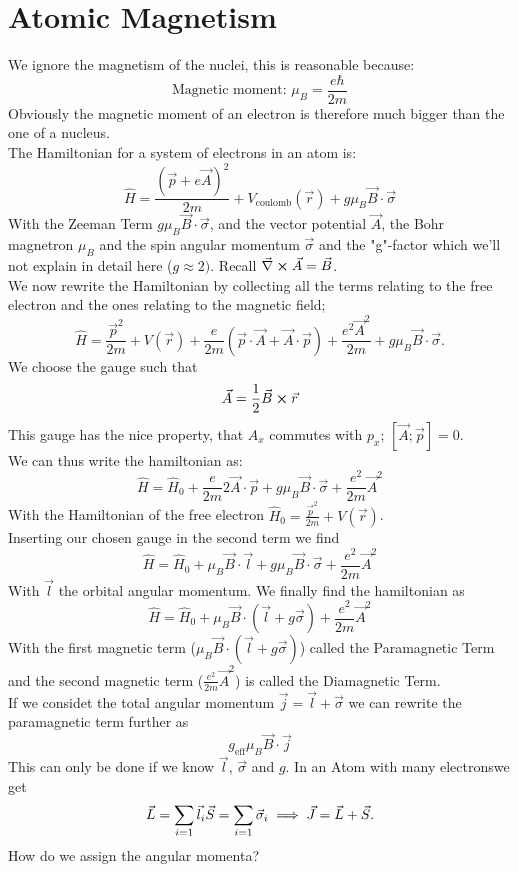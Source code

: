 \documentclass{report}
\begin{document}
\section{Atomic Magnetism}
We ignore the magnetism of the nuclei, this is reasonable because: \[
\text{Magnetic moment: } \mu_B = \frac{e\hbar }{2m}
\] Obviously the magnetic moment of an electron is therefore much bigger than the one of a nucleus.\\
The Hamiltonian for a system of electrons in an atom is: \[
	\hat{H} = \frac{\left( \vec{p} + e \vec{A} \right)^2 }{2m} + V_\text{coulomb}(\vec{r}) + g\mu_B \vec{B} \cdot \vec{\sigma} 
\] With the Zeeman Term $g\mu_B \vec{B} \cdot \vec{\sigma}$, and the vector potential $\vec{A}$, the Bohr magnetron $\mu_B$ and the spin angular momentum $\vec{\sigma}$ and the "g"-factor which we'll not explain in detail here ($g \approx 2)$. Recall $\vec{\nabla} \cross \vec{A} = \vec{B}$.\\
We now rewrite the Hamiltonian by collecting all the terms relating to the free electron and the ones relating to the magnetic field; \[
	\hat{H} = \frac{\vec{p}^2}{2m} + V(\vec{r}) + \frac{e}{2m}\left( \vec{p}\cdot\vec{A} + \vec{A} \cdot \vec{p} \right) + \frac{e^2 \vec{A}^2}{2m} + g\mu_B \vec{B}\cdot \vec{\sigma}
.\] We choose the gauge such that \[
\vec{A} = \frac{1}{2} \vec{B} \cross \vec{r}
\] This gauge has the nice property, that $A_x$ commutes with $p_x$; $[\vec{A}; \vec{p}] = 0$.\\
We can thus write the hamiltonian as: \[
\hat{H} = \hat{H}_0 + \frac{e}{2m} 2 \vec{A} \cdot \vec{p} +g \mu_B \vec{B} \cdot \vec{\sigma} + \frac{e^2}{2m} \vec{A}^2
\] 
With the Hamiltonian of the free electron $\hat{H}_0 = \frac{\vec{p}^2}{2m} + V(\vec{r})$.\\
Inserting our chosen gauge in the second term we find \[
\hat{H} = \hat{H}_0 + \mu_B \vec{B} \cdot \vec{l} + g \mu_B \vec{B} \cdot \vec{\sigma} + \frac{e^2}{2m} \vec{A}^2
\] With $\vec{l}$ the orbital angular momentum.
We finally find the hamiltonian as \[
\hat{H} = \hat{H}_0 + \mu_B \vec{B} \cdot \left( \vec{l} + g \vec{\sigma} \right) + \frac{e^2}{2m} \vec{A}^2
\] With the first magnetic term ($\mu_B \vec{B}\cdot\left( \vec{l} + g \vec{\sigma} \right) $) called the Paramagnetic Term and the second magnetic term ($\frac{e^2}{2m} \vec{A}^2$) is called the Diamagnetic Term. \\
If we considet the total angular momentum $\vec{j} = \vec{l} + \vec{\sigma}$ we can rewrite the paramagnetic term further as \[
g_\text{eff} \mu_B \vec{B} \cdot \vec{j}
\] This can only be done if we know $\vec{l}$, $\vec{\sigma}$ and $g$. In an Atom with many electronswe get \[
\vec{L} = \sum_{i=1} \vec{l}_i\\
\vec{S} = \sum_{i=1} \vec{\sigma}_i\\
\implies \vec{J} = \vec{L} + \vec{S}
.\]  How do we assign the angular momenta?
\end{document}
